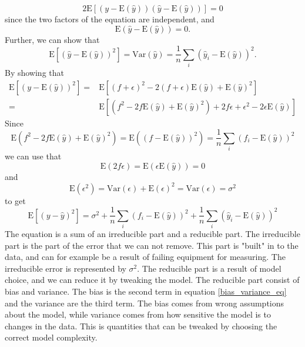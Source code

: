 \begin{equation}
2\text{E}[(y-\text{E}(\hat{y}))(\hat{y}-\text{E}(\hat{y}))] = 0
\end{equation}
since the two factors of the equation are independent, and 
\begin{equation}
\text{E}(\hat{y}-\text{E}(\hat{y})) = 0.
\end{equation}
Further, we can show that 
\begin{equation}
\text{E}[(\hat{y} - \text{E}(\hat{y}))^2] = \text{Var}(\hat{y}) = \frac{1}{n}\sum_i(\hat{y}_i - \text{E}(\hat{y}))^2.
\end{equation}
By showing that
\begin{equation}
\begin{split}
\text{E}[(y-\text{E}(\hat{y}))^2] = & \text{E}[ (f+\epsilon)^2 - 2(f+\epsilon)\text{E}(\hat{y}) + \text{E}(\hat{y})^2  ] \\
= & \text{E}[(f^2 - 2f\text{E}(\hat{y}) + \text{E}(\hat{y})^2) + 2f\epsilon + \epsilon^2 - 2\epsilon\text{E}(\hat{y}) ]
\end{split}
\end{equation}
Since 
\begin{equation}
\text{E}(f^2 - 2f\text{E}(\hat{y}) + \text{E}(\hat{y})^2) = \text{E}((f-\text{E}(\hat{y}))^2) = \frac{1}{n}\sum_i(f_i - \text{E}(\hat{y}))^2
\end{equation}
we can use that
\begin{equation}
    \text{E}(2f\epsilon) = \text{E}(\epsilon\text{E}(\hat{y})) = 0
\end{equation}
and
\begin{equation}
    \text{E}(\epsilon^2) = \text{Var}(\epsilon) + \text{E}(\epsilon)^2 = \text{Var}(\epsilon) = \sigma^2
\end{equation}
to get 
\begin{equation}
\text{E}[(y - \hat{y})^2] = \sigma^2 + \frac{1}{n}\sum_i(f_i - \text{E}(\hat{y}))^2 + \frac{1}{n}\sum_i(\hat{y}_i - \text{E}(\hat{y}))^2
\label{bias_variance_eq}
\end{equation}
The equation is a sum of an irreducible part and a reducible part. The irreducible part is the part of the error that we can not remove.\cite{hastie} This part is "built" in to the data, and can for example be a result of failing equipment for measuring. The irreducible error is represented by $\sigma^2$.  The reducible part is a result of model choice, and we can reduce it by tweaking the model.\cite{hastie} The reducible part consist of bias and variance. The bias is the second term in equation \ref{bias_variance_eq} and the variance are the third term. The bias comes from wrong assumptions about the model, while variance comes from how sensitive the model is to changes in the data. This is quantities that can be tweaked by choosing the correct model complexity. 
